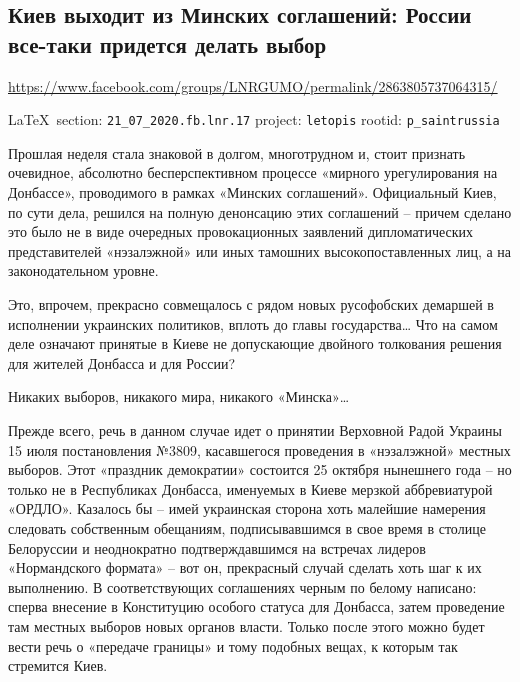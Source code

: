  
 
\subsection{Киев выходит из Минских соглашений: России все-таки придется делать выбор}
\url{https://www.facebook.com/groups/LNRGUMO/permalink/2863805737064315/}
  
\vspace{0.5cm}
{\small\LaTeX~section: \verb|21_07_2020.fb.lnr.17| project: \verb|letopis| rootid: \verb|p_saintrussia|}
\vspace{0.5cm}


Прошлая неделя стала знаковой в долгом, многотрудном и, стоит признать
очевидное, абсолютно бесперспективном процессе «мирного урегулирования на
Донбассе», проводимого в рамках «Минских соглашений». Официальный Киев, по сути
дела, решился на полную денонсацию этих соглашений – причем сделано это было не
в виде очередных провокационных заявлений дипломатических представителей
«нэзалэжной» или иных тамошних высокопоставленных лиц, а на законодательном
уровне.

Это, впрочем, прекрасно совмещалось с рядом новых русофобских демаршей в
исполнении украинских политиков, вплоть до главы государства… Что на самом деле
означают принятые в Киеве не допускающие двойного толкования решения для
жителей Донбасса и для России?

Никаких выборов, никакого мира, никакого «Минска»…

Прежде всего, речь в данном случае идет о принятии Верховной Радой Украины 15
июля постановления №3809, касавшегося проведения в «нэзалэжной» местных
выборов. Этот «праздник демократии» состоится 25 октября нынешнего года – но
только не в Республиках Донбасса, именуемых в Киеве мерзкой аббревиатурой
«ОРДЛО». Казалось бы – имей украинская сторона хоть малейшие намерения
следовать собственным обещаниям, подписывавшимся в свое время в столице
Белоруссии и неоднократно подтверждавшимся на встречах лидеров «Нормандского
формата» – вот он, прекрасный случай сделать хоть шаг к их выполнению. В
соответствующих соглашениях черным по белому написано: сперва внесение в
Конституцию особого статуса для Донбасса, затем проведение там местных выборов
новых органов власти. Только после этого можно будет вести речь о «передаче
границы» и тому подобных вещах, к которым так стремится Киев.

